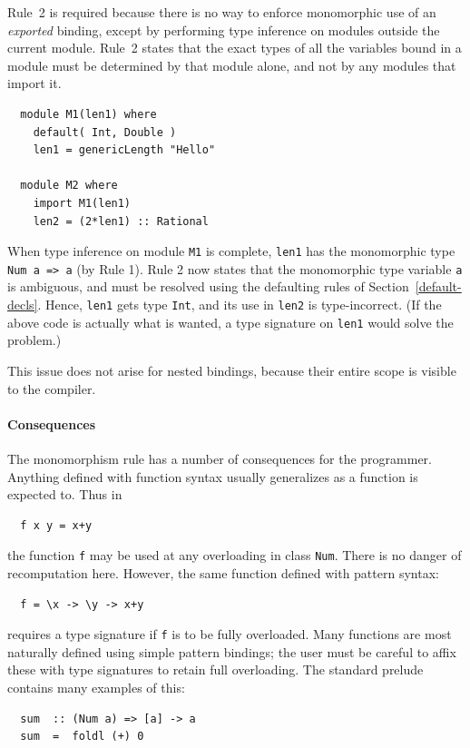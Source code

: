 Rule~2 is required because there is no way to enforce monomorphic use
of an {\em exported} binding, except by performing type inference on modules
outside the current module.  Rule~2 states that the exact types of all
the variables bound in a module must be determined by that module alone, and not
by any modules that import it.
\bprog
{\small\begin{verbatim}
  module M1(len1) where
    default( Int, Double )
    len1 = genericLength "Hello"

  module M2 where
    import M1(len1)
    len2 = (2*len1) :: Rational
\end{verbatim}}
\eprog
When type inference on module \mbox{\tt M1} is complete, \mbox{\tt len1} has the 
monomorphic type \mbox{\tt Num\ a\ =>\ a} (by Rule 1).  Rule 2 now states that
the monomorphic type variable \mbox{\tt a} is ambiguous, and must be resolved using
the defaulting rules of Section~\ref{default-decls}.
Hence, \mbox{\tt len1} gets type \mbox{\tt Int}, and its use in \mbox{\tt len2} is type-incorrect.
(If the above code is actually what is wanted, a type signature on
\mbox{\tt len1} would solve the problem.)

This issue does not arise for nested bindings, because their entire scope is 
visible to the compiler.

\paragraph*{Consequences}

The monomorphism rule has a number of consequences for the programmer.
Anything defined with function syntax usually
generalizes as a function is expected to.  Thus in
\bprog
{\small\begin{verbatim}
  f x y = x+y
\end{verbatim}}
\eprog
the function \mbox{\tt f} may be used at any overloading in class \mbox{\tt Num}.
There is no danger of recomputation here.  However, the same function
defined with pattern syntax:
\bprog
{\small\begin{verbatim}
  f = \x -> \y -> x+y
\end{verbatim}}
\eprog
requires a type signature if \mbox{\tt f} is to be fully overloaded.
Many functions are most naturally defined using simple pattern
bindings; the user must be careful to affix these with type signatures
to retain full overloading.  The standard prelude contains many
examples of this:
\bprog
{\small\begin{verbatim}
  sum  :: (Num a) => [a] -> a
  sum  =  foldl (+) 0  
\end{verbatim}}
\eprog

